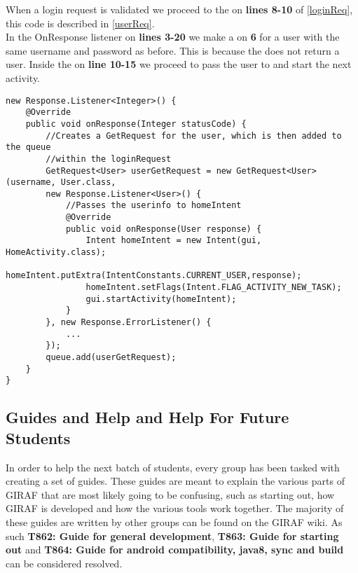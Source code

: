When a login request is validated we proceed to the  on
\textbf{lines 8-10} of \autoref{loginReq}, this code is described in
\autoref{userReq}.\\
In the OnResponse listener on \textbf{lines 3-20} we make a 
on \textbf{6} for a user with the same username and password as before. This is
because the  does not return a user. Inside the
 on \textbf{line 10-15} we proceed to pass the user
to  and start the next activity.\nl

\begin{minipage}[H]{\linewidth}
\begin{lstlisting}[caption = If the user information is authenticated we proceed
with a request for user, label = userReq] new Response.Listener<Integer>() {
	@Override
    public void onResponse(Integer statusCode) {
    	//Creates a GetRequest for the user, which is then added to the queue
    	//within the loginRequest 
    	GetRequest<User> userGetRequest = new GetRequest<User>(username, User.class, 
    	new Response.Listener<User>() {
        	//Passes the userinfo to homeIntent
            @Override
            public void onResponse(User response) {
            	Intent homeIntent = new Intent(gui, HomeActivity.class);
                homeIntent.putExtra(IntentConstants.CURRENT_USER,response);
                homeIntent.setFlags(Intent.FLAG_ACTIVITY_NEW_TASK);
                gui.startActivity(homeIntent);
            }
        }, new Response.ErrorListener() {
			...
        });
        queue.add(userGetRequest);
	}
}
\end{lstlisting}
\end{minipage}



\subsection{Guides and Help and Help For Future Students}
In order to help the next batch of students, every group has been tasked with
creating a set of guides. These guides are meant to explain the various
parts of GIRAF that are most likely going to be confusing, such as starting out,
how GIRAF is developed and how the various tools work together. The
majority of these guides are written by other groups can be found on the GIRAF
wiki\citep{GWiki}. As such \textbf{T862: Guide for general development},
\textbf{T863: Guide for starting out} and \textbf{T864: Guide for android
compatibility, java8, sync and build} can be considered resolved.

